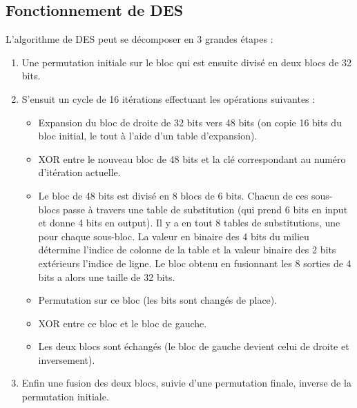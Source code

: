 \documentclass[a4paper,12pt]{article}
\begin{document}
\clearpage

\subsection{Fonctionnement de DES}	

L'algorithme de DES peut se décomposer en 3 grandes étapes :

\begin{enumerate}
\item Une permutation initiale sur le bloc qui est ensuite divisé en deux blocs de 32 bits.

\item S'ensuit un cycle de 16 itérations effectuant les opérations suivantes :
\begin{itemize}
\item Expansion du bloc de droite de 32 bits vers 48 bits (on copie 16 bits du bloc initial, le tout à l'aide d'un table d'expansion). 
\item XOR entre le nouveau bloc de 48 bits et la clé correspondant au numéro d'itération actuelle.
\item Le bloc de 48 bits est divisé en 8 blocs de 6 bits. Chacun de ces sous-blocs passe à travers une table de substitution (qui prend 6 bits en input et donne 4 bits en output). Il y a en tout 8 tables de substitutions, une pour chaque sous-bloc. La valeur en binaire des 4 bits du milieu détermine l'indice de colonne de la table et la valeur binaire des 2 bits extérieurs l'indice de ligne. Le bloc obtenu en fusionnant les 8 sorties de 4 bits a alors une taille de 32 bits.
\item Permutation sur ce bloc (les bits sont changés de place).
\item XOR entre ce bloc et le bloc de gauche.
\item Les deux blocs sont échangés (le bloc de gauche devient celui de droite et inversement).
\end{itemize}


\item Enfin une fusion des deux blocs, suivie d'une permutation finale, inverse de la permutation initiale.
\end{enumerate}
\end{document}
